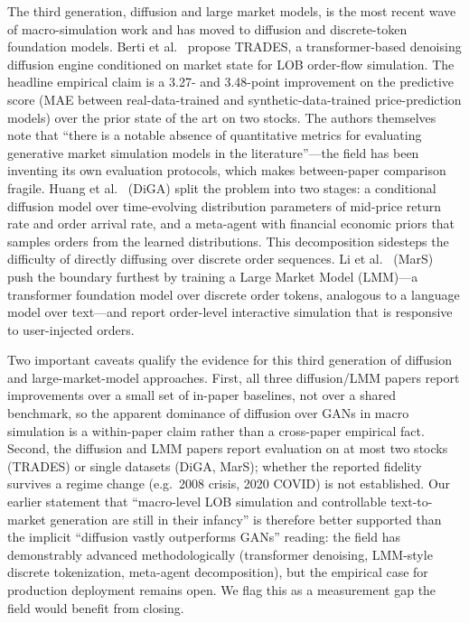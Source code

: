 The third generation, diffusion and large market models, is the most recent wave of macro-simulation work and has moved to diffusion and discrete-token foundation models. Berti et al.~\citep{berti2025trades} propose TRADES, a transformer-based denoising diffusion engine conditioned on market state for LOB order-flow simulation. The headline empirical claim is a 3.27- and 3.48-point improvement on the predictive score (MAE between real-data-trained and synthetic-data-trained price-prediction models) over the prior state of the art on two stocks. The authors themselves note that ``there is a notable absence of quantitative metrics for evaluating generative market simulation models in the literature''---the field has been inventing its own evaluation protocols, which makes between-paper comparison fragile. Huang et al.~\citep{huang2024diga} (DiGA) split the problem into two stages: a conditional diffusion model over time-evolving distribution parameters of mid-price return rate and order arrival rate, and a meta-agent with financial economic priors that samples orders from the learned distributions. This decomposition sidesteps the difficulty of directly diffusing over discrete order sequences. Li et al.~\citep{li2025mars} (MarS) push the boundary furthest by training a Large Market Model (LMM)---a transformer foundation model over discrete order tokens, analogous to a language model over text---and report order-level interactive simulation that is responsive to user-injected orders.

Two important caveats qualify the evidence for this third generation of diffusion and large-market-model approaches. First, all three diffusion/LMM papers report improvements over a small set of in-paper baselines, not over a shared benchmark, so the apparent dominance of diffusion over GANs in macro simulation is a within-paper claim rather than a cross-paper empirical fact. Second, the diffusion and LMM papers report evaluation on at most two stocks (TRADES) or single datasets (DiGA, MarS); whether the reported fidelity survives a regime change (e.g.\ 2008 crisis, 2020 COVID) is not established. Our earlier statement that ``macro-level LOB simulation and controllable text-to-market generation are still in their infancy'' is therefore better supported than the implicit ``diffusion vastly outperforms GANs'' reading: the field has demonstrably advanced methodologically (transformer denoising, LMM-style discrete tokenization, meta-agent decomposition), but the empirical case for production deployment remains open. We flag this as a measurement gap the field would benefit from closing.


